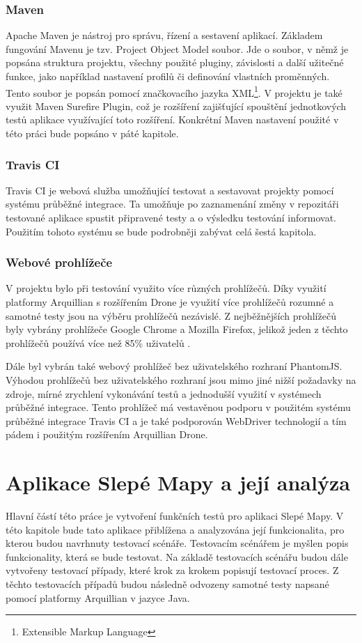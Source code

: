 \documentclass[
    color,   %
	table,   %
    twoside, %
]{fithesis3}
\begin{document}
\subsection{Maven}
Apache Maven \cite{Maven} je nástroj pro správu, řízení a sestavení aplikací. Základem fungování Mavenu je tzv. Project Object Model soubor. Jde o soubor, v němž je popsána struktura projektu, všechny použité pluginy, závislosti a další užitečné funkce, jako například nastavení profilů či definování vlastních proměnných. Tento soubor je popsán pomocí značkovacího jazyka XML\footnote{Extensible Markup Language}. V projektu je také využit Maven Surefire Plugin, což je rozšíření zajišťující spouštění jednotkových testů aplikace využívající toto rozšíření. Konkrétní Maven nastavení použité v této práci bude popsáno v páté kapitole.
\subsection{Travis CI}
Travis CI je webová služba umožňující testovat a sestavovat projekty pomocí systému průběžné integrace. Ta umožňuje po zaznamenání změny v repozitáři testované aplikace spustit připravené testy a o výsledku testování informovat. Použitím tohoto systému se bude podrobněji zabývat celá šestá kapitola.
\subsection{Webové prohlížeče}
V projektu bylo při testování využito více různých prohlížečů. Díky využití platformy Arquillian s rozšířením Drone je využití více prohlížečů rozumné a samotné testy jsou na výběru prohlížečů nezávislé. Z nejběžnějších prohlížečů byly vybrány prohlížeče Google Chrome a Mozilla Firefox, jelikož jeden z těchto prohlížečů používá více než 85\% uživatelů \cite{Browsers}.

Dále byl vybrán také webový prohlížeč bez uživatelského rozhraní PhantomJS. Výhodou prohlížečů bez uživatelského rozhraní jsou mimo jiné nižší požadavky na zdroje, mírné zrychlení vykonávání testů a jednodušší využití v systémech průběžné integrace. Tento prohlížeč má vestavěnou podporu v použitém systému průběžné integrace Travis CI a je také podporován WebDriver technologií a tím pádem i použitým rozšířením Arquillian Drone.

\chapter{Aplikace Slepé Mapy a její analýza}
Hlavní částí této práce je vytvoření funkčních testů pro aplikaci Slepé Mapy. V této kapitole bude tato aplikace přiblížena a analyzována její funkcionalita, pro kterou  budou navrhnuty testovací scénáře. Testovacím scénářem je myšlen popis funkcionality, která se bude testovat. Na základě testovacích scénářu budou dále vytvořeny testovací případy, které krok za krokem popisují testovací proces. Z těchto testovacích případů budou následně odvozeny samotné testy napsané pomocí platformy Arquillian v jazyce Java.
\end{document}
